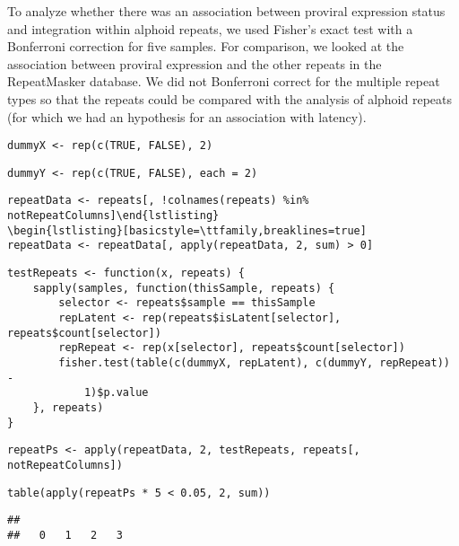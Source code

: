 \documentclass[../../sherrill-Mix_thesis.tex]{subfiles}
\makeatletter
\newenvironment{kframe}{%
 \def\at@end@of@kframe{}%
 \ifinner\ifhmode%
  \def\at@end@of@kframe{\end{minipage}}%
  \begin{minipage}{\columnwidth}%
 \fi\fi%
 \def\FrameCommand##1{\hskip\@totalleftmargin \hskip-\fboxsep
 \colorbox{shadecolor}{##1}\hskip-\fboxsep
     \hskip-\linewidth \hskip-\@totalleftmargin \hskip\columnwidth}%
 \MakeFramed {\advance\hsize-\width
   \@totalleftmargin\z@ \linewidth\hsize
   \@setminipage}}%
 {\par\unskip\endMakeFramed%
 \at@end@of@kframe}
\newenvironment{knitrout}{}{} %
\makeatother
\begin{document}
To analyze whether there was an association between proviral expression status and integration within alphoid repeats, we used Fisher's exact test with a Bonferroni correction for five samples. For comparison, we looked at the association between proviral expression and the other repeats in the RepeatMasker database. We did not Bonferroni correct for the multiple repeat types so that the repeats could be compared with the analysis of alphoid repeats (for which we had an  hypothesis for an association with latency).
\begin{knitrout}
\color{fgcolor}\begin{kframe}
\begin{lstlisting}[basicstyle=\ttfamily,breaklines=true]
dummyX <- rep(c(TRUE, FALSE), 2)\end{lstlisting}
\begin{lstlisting}[basicstyle=\ttfamily,breaklines=true]
dummyY <- rep(c(TRUE, FALSE), each = 2)\end{lstlisting}
\begin{lstlisting}[basicstyle=\ttfamily,breaklines=true]
repeatData <- repeats[, !colnames(repeats) %in% notRepeatColumns]\end{lstlisting}
\begin{lstlisting}[basicstyle=\ttfamily,breaklines=true]
repeatData <- repeatData[, apply(repeatData, 2, sum) > 0]\end{lstlisting}
\begin{lstlisting}[basicstyle=\ttfamily,breaklines=true]
testRepeats <- function(x, repeats) {
    sapply(samples, function(thisSample, repeats) {
        selector <- repeats$sample == thisSample
        repLatent <- rep(repeats$isLatent[selector], repeats$count[selector])
        repRepeat <- rep(x[selector], repeats$count[selector])
        fisher.test(table(c(dummyX, repLatent), c(dummyY, repRepeat)) - 
            1)$p.value
    }, repeats)
}\end{lstlisting}
\begin{lstlisting}[basicstyle=\ttfamily,breaklines=true]
repeatPs <- apply(repeatData, 2, testRepeats, repeats[, notRepeatColumns])\end{lstlisting}
\begin{lstlisting}[basicstyle=\ttfamily,breaklines=true]
table(apply(repeatPs * 5 < 0.05, 2, sum))\end{lstlisting}
\begin{lstlisting}[basicstyle=\ttfamily,breaklines=true]
## 
##   0   1   2   3 

\end{lstlisting}
\end{kframe}
\end{knitrout}
\end{document}
